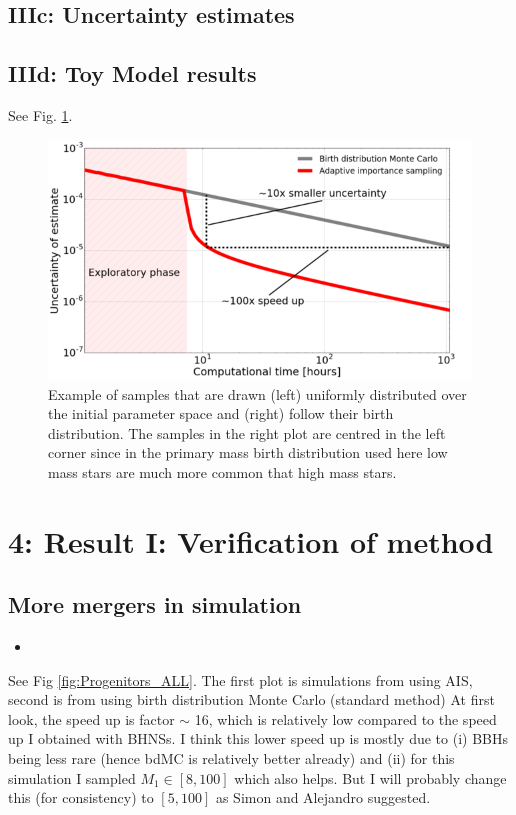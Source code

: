 \documentclass[a4paper,fleqn,usenatbib]{mnras}
\begin{document}
\subsection{IIIc: Uncertainty estimates}

\subsection{IIId: Toy Model results}
See Fig. \ref{fig:ToyModel-speedUp}. 

\begin{figure}
	\includegraphics[width=\columnwidth]{images/speedUpToyModel.png}
    \caption{Example of   samples that are drawn (left)  uniformly distributed over the initial parameter space and (right) follow their birth distribution. The samples in the right plot are centred in the left corner since in the primary mass birth distribution used here low mass stars are much more common that high mass stars. }
    \label{fig:ToyModel-speedUp}
\end{figure}





\section{4: Result I: Verification of method}
\label{sec:Verification}



\subsection{More mergers in simulation}
\label{subsec:AISsampling}
%
%
\begin{itemize}
\item 
\end{itemize}
%
See Fig \ref{fig:Progenitors_ALL}. 
The first plot is simulations from using AIS, second is from using birth distribution Monte Carlo (standard method) At first look, the speed up is factor $\sim$ 16, which is relatively low compared to the speed up I obtained with BHNSs.  I think this lower speed up is mostly due to (i) BBHs being less rare (hence bdMC is relatively better already) and (ii) for this simulation I sampled $M_1 \in [8,100]$ which also helps. But I will probably change this (for consistency) to $[5,100]$  as Simon and Alejandro suggested.
\end{document}
